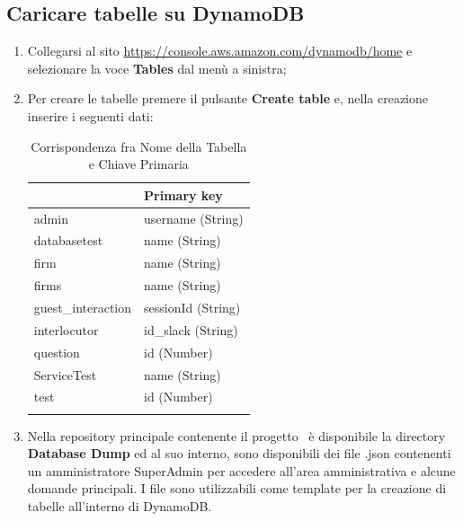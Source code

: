\documentclass[../ManualeSviluppatore_v2.0.0.tex]{subfiles}
\begin{document}
	\subsection{Caricare tabelle su DynamoDB}
		\begin{enumerate}
		\item Collegarsi al sito \url{https://console.aws.amazon.com/dynamodb/home} e selezionare la voce \textbf{Tables} dal menù a sinistra;
		\item Per creare le tabelle premere il pulsante \textbf{Create table} e, nella creazione inserire i seguenti dati:
			\begin{longtable}[c] { >{\centering\arraybackslash}p{5cm} >{\centering\arraybackslash}p{5cm} }
				\toprule
				{\textbf{Table name}} & {\textbf{Primary key}} \\
				\midrule
				admin & username (String) \\
		 		\addlinespace[0.3em]
				\midrule
				databasetest & name (String) \\
		 		\addlinespace[0.3em]
		 		\midrule
				firm & name (String) \\
		 		\addlinespace[0.3em]
		 		\midrule
				firms & name (String) \\
		 		\addlinespace[0.3em]
		 		\midrule
				guest\_interaction & sessionId (String) \\
		 		\addlinespace[0.3em]
		 		\midrule
				interlocutor & id\_slack (String) \\
		 		\addlinespace[0.3em]
		 		\midrule
				question & id (Number) \\
		 		\addlinespace[0.3em]
		 		\midrule
				ServiceTest & name (String) \\
		 		\addlinespace[0.3em]
		 		\midrule
				test & id (Number) \\
		 		\addlinespace[0.3em]
		 		\bottomrule
		 		\caption{Corrispondenza fra Nome della Tabella e Chiave Primaria}
		 	\end{longtable}
		\item Nella repository principale contenente il progetto \atavi\ è disponibile la directory \textbf{Database Dump} ed al suo interno, sono disponibili dei file .json contenenti un amministratore SuperAdmin per accedere all'area amministrativa e alcune domande principali. I file sono utilizzabili come template per la creazione di tabelle all'interno di DynamoDB.
	\end{enumerate}
	
\end{document}
